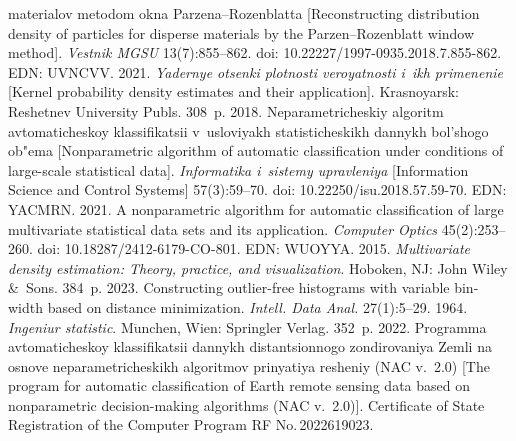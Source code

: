 \begin{multicols}{2}
{{\begin{thebibliography}{99}
materialov metodom okna Parzena--Rozenblatta [Reconstructing distribution density of particles for 
disperse materials by the Parzen--Rozenblatt window method]. \textit{Vestnik MGSU} 
 13(7):855--862. doi: 10.22227/1997-0935.2018.7.855-862. EDN: UVNCVV.
 2021. \textit{Yadernye otsenki plotnosti veroyatnosti i~ikh 
primenenie} [Kernel probability density estimates and their application]. Krasnoyarsk: Reshetnev 
University Publs. 308~p.
 2018. Ne\-pa\-ra\-met\-ri\-che\-skiy algoritm avtomaticheskoy 
klassifikatsii v~usloviyakh sta\-ti\-sti\-che\-skikh dannykh bol'shogo ob"ema [Nonparametric algorithm 
of automatic classification under conditions of large-scale statistical data]. \textit{Informatika 
i~sistemy upravleniya} [Information Science and Control Systems] 57(3):59--70. doi: 
10.22250/isu.2018.57.59-70. EDN: YACMRN.
 2021. A nonparametric algorithm for automatic classification of large 
multivariate statistical data sets and its application. \textit{Computer Optics} 45(2):253--260. doi:  
10.18287/2412-6179-CO-801. EDN: WUOYYA.
 2015. \textit{Multivariate density estimation: Theory, practice, and 
visualization}. Hoboken, NJ: John Wiley \&~Sons. 384~p.
 2023. Constructing outlier-free histograms with 
variable bin-width based on distance minimization. \textit{Intell. Data Anal.} 27(1):5--29.
 1964. \textit{Ingeniur statistic}. 
M$\ddot{\mbox{u}}$nchen, Wien: Springler Verlag. 352~p.
 2022. 
Programma avtomaticheskoy klassifikatsii dannykh distantsionnogo zondirovaniya Zemli na 
osnove neparametricheskikh algoritmov prinyatiya resheniy (NAC v.~2.0) [The program for 
automatic classification of Earth remote sensing data based on nonparametric decision-making 
algorithms (NAC v.~2.0)]. Certificate of State Registration of the Computer Program RF 
No.\,2022619023.

\end{thebibliography}

 }
 }

\end{multicols}

\vspace*{-6pt}

